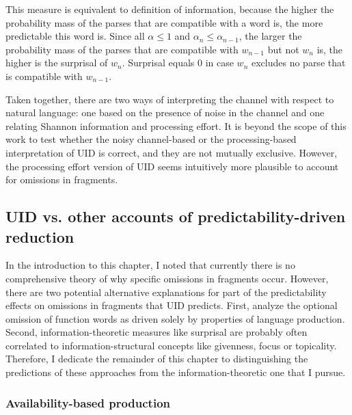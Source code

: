 This measure is equivalent to  definition of information, because the higher the probability mass of the parses that are compatible with a word is, the more predictable this word is. Since all $\alpha\leq1$ and $\alpha_n\leq\alpha_{n-1}$, the larger the probability mass of the parses that are compatible with $w_{n-1}$ but not $w_n$ is, the higher is the surprisal of $w_n$. Surprisal equals 0 in case $w_n$ excludes no parse that is compatible with $w_{n-1}$.

Taken together, there are two ways of interpreting the channel with respect to natural language: one based on the presence of noise in the channel and one relating Shannon information and processing effort. It is beyond the scope of this work to test whether the noisy channel-based or the processing-based interpretation of UID is correct, and they are not mutually exclusive. However, the processing effort version of UID seems intuitively more plausible to account for omissions in fragments.

\subsection{UID vs. other accounts of predictability-driven reduction}
\label{sec:infotheory-uid-competing}
In the introduction to this chapter, I noted that currently there is no comprehensive theory of why specific omissions in fragments occur. However, there are two potential alternative explanations for part of the predictability effects on omissions in fragments that UID predicts. First, \citet{ferreira.dell2000} analyze the optional omission of function words as driven solely by properties of language production. Second, information-theoretic measures like surprisal are probably often correlated to information-structural concepts like givenness, focus or topicality. Therefore, I dedicate the remainder of this chapter to distinguishing the predictions of these approaches from the information-theoretic one that I pursue. 

\subsubsection{Availability-based production}
\label{sec:infotheory-uid-competing-abp}

